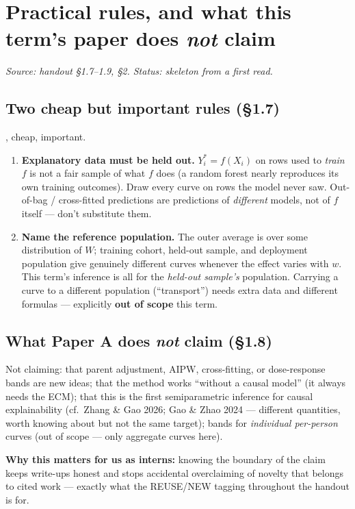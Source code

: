 \section{Practical rules, and what this term's paper does \emph{not} claim}
\label{sec:scope}

\emph{Source: handout \S1.7--1.9, \S2. Status: skeleton from a first read.}

\subsection{Two cheap but important rules (\S1.7)}

\newtag, cheap, important.
\begin{enumerate}
  \item \textbf{Explanatory data must be held out.} $Y_i^* = f(X_i)$ on rows
    used to \emph{train} $f$ is not a fair sample of what $f$ does (a random
    forest nearly reproduces its own training outcomes). Draw every curve
    on rows the model never saw. Out-of-bag / cross-fitted predictions are
    predictions of \emph{different} models, not of $f$ itself --- don't
    substitute them.
  \item \textbf{Name the reference population.} The outer average is over
    some distribution of $W$; training cohort, held-out sample, and
    deployment population give genuinely different curves whenever the
    effect varies with $w$. This term's inference is all for the
    \emph{held-out sample's} population. Carrying a curve to a different
    population (``transport'') needs extra data and different formulas ---
    explicitly \textbf{out of scope} this term.
\end{enumerate}

\subsection{What Paper A does \emph{not} claim (\S1.8)}

Not claiming: that parent adjustment, AIPW, cross-fitting, or dose-response
bands are new ideas; that the method works ``without a causal model'' (it
always needs the ECM); that this is the first semiparametric inference for
causal explainability (cf.\ Zhang \& Gao 2026; Gao \& Zhao 2024 --- different
quantities, worth knowing about but not the same target); bands for
\emph{individual per-person} curves (out of scope --- only aggregate curves
here).

\textbf{Why this matters for us as interns:} knowing the boundary of the
claim keeps write-ups honest and stops accidental overclaiming of novelty
that belongs to cited work --- exactly what the REUSE/NEW tagging throughout
the handout is for.

